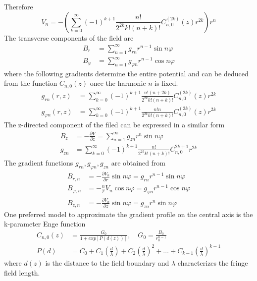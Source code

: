 Therefore
	\begin{equation}
		V_n = - \left( \sum_{k=0}^{\infty} (-1)^{k+1} \frac{n!}{2^{2k} k! (n+k)!} C_{n, 0}^{(2k)}(z) r^{2k} \right) r^n
	\end{equation}			
The transverse components of the field are
	\begin{align}
		B_r & = \sum_{n=1}^{\infty} g_{rn} r^{n-1} \sin n \varphi \\
		B_{\varphi} & = \sum_{n=1}^{\infty} g_{\varphi n} r^{n-1} \cos n \varphi
	\end{align}	
where the following gradients determine the entire potential and can be deduced from the function $C_{n,0}(z)$ once the harmonic $n$ is fixed.
	\begin{align}
		g_{rn} (r,z) & = \sum_{k=0}^{\infty} (-1)^{k+1} \frac{n! (n+2k)}{2^{2k} k! (n+k)!} C_{n,0}^{(2k)}(z)r^{2k} \\	
		g_{ \varphi n} (r,z) & = \sum_{k=0}^{\infty} (-1)^{k+1} \frac{n!n}{2^{2k} k! (n+k)!} C_{n,0}^{(2k)}(z)r^{2k}
	\end{align}
The z-directed component of the filed can be expressed in a similar form
	\begin{align}
		B_z & = - \frac{\partial V}{\partial z} =  \sum_{n=1}^{\infty} g_{zn} r^n \sin n \varphi \\
		g_{zn} & = \sum_{k=0}^{\infty} (-1)^{k+1} \frac{n!}{2^{2k} k! (n+k)!} C_{n,0}^{2k+1} r^{2k}
	\end{align}
The gradient functions $g_{rn}, g_{\varphi n}, g_{zn}$ are obtained from
	\begin{align}
		B_{r,n} & = - \frac{\partial V_n}{\partial r} \sin n \varphi = g_{rn} r^{n-1} \sin n \varphi \\
		B_{\varphi,n} & = - \frac{n}{r} V_n \cos n \varphi = g_{\varphi n} r^{n-1} \cos n \varphi \\
		B_{z,n} & = - \frac{\partial V_n}{\partial z} \sin n \varphi = g_{zn} r^{n} \sin n \varphi
	\end{align}
One preferred model to approximate the gradient profile on the central axis is the k-parameter Enge function
	\begin{align}
		C_{n,0}(z) & = \frac{G_0}{1+exp[P(d(z))]}, \quad G_0 = \frac{B_0}{r_0^{n-1}} \\
		P(d) & = C_0 + C_1 \left( \frac{d}{\lambda} \right) + C_2 \left( \frac{d}{\lambda} \right)^2 + \dots + C_{k-1} \left( \frac{d}{\lambda} \right)^{k-1} 
	\end{align}
where $d(z)$ is the distance to the field boundary and $\lambda$ characterizes the fringe field length. 

